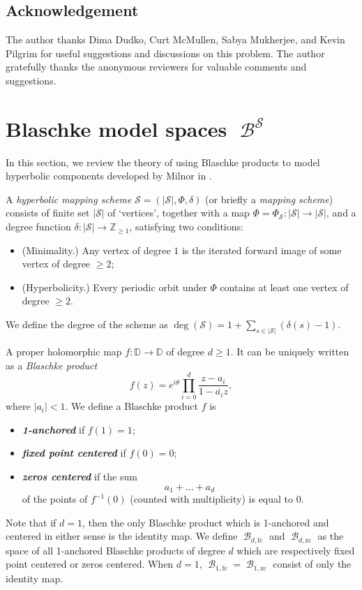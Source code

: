 \documentclass[11pt, reqno]{amsart}
\numberwithin{equation}{section}
\theoremstyle{plain}
\theoremstyle{theorem}
\theoremstyle{definition}
\newcommand{\Z}{\mathbb{Z}}
\newcommand{\D}{\mathbb{D}}
\newcommand{\fc}{\text{fc}}
\newcommand{\zc}{\text{zc}}
\DeclareMathOperator{\BP}{\mathcal{B}}
\numberwithin{figure}{section}
\begin{document}
\subsection*{Acknowledgement}
The author thanks Dima Dudko, Curt McMullen, Sabya Mukherjee, and Kevin Pilgrim for useful suggestions and discussions on this problem.
The author gratefully thanks the anonymous reviewers for valuable comments and suggestions.

\section{Blaschke model spaces $\BP^\mathcal{S}$}\label{sec:bms}
In this section, we review the theory of using Blaschke products to model hyperbolic components developed by Milnor in \cite{Milnor12}.

A {\em hyperbolic mapping scheme} $\mathcal{S} = (|\mathcal{S}|, \Phi, \delta)$ (or briefly a {\em mapping scheme}) consists of finite set $|\mathcal{S}|$ of `vertices', together with a map $\Phi = \Phi_{\mathcal{S}}: |\mathcal{S}| \longrightarrow |\mathcal{S}|$, and a degree function $\delta : |\mathcal{S}| \longrightarrow \Z_{\geq 1}$, satisfying two conditions:
\begin{itemize}
\item (Minimality.) Any vertex of degree $1$ is the iterated forward image of some vertex of degree $\geq 2$;
\item (Hyperbolicity.) Every periodic orbit under $\Phi$ contains at least one vertex of degree $\geq 2$.
\end{itemize}
We define the degree of the scheme as
$\deg(\mathcal{S}) = 1+ \sum_{s\in |\mathcal{S}|} (\delta(s)-1)$.

A proper holomorphic map $f: \D\longrightarrow \D$ of degree $d\geq 1$. 
It can be uniquely written as a {\em Blaschke product}
$$
f(z) = e^{i\theta}\prod_{i=0}^d \frac{z-a_i}{1-\overline{a_i}z},
$$
where $|a_i|<1$.
We define a Blaschke product $f$ is 
\begin{itemize}
\item {\bf \em 1-anchored} if $f(1) = 1$;
\item {\bf \em fixed point centered} if $f(0) = 0$;
\item {\bf \em zeros centered} if the sum
$$
a_1+... + a_d
$$
of the points of $f^{-1}(0)$ (counted with multiplicity) is equal to $0$.
\end{itemize}
Note that if $d=1$, then the only Blaschke product which is 1-anchored and centered in either sense is the identity map.
We define $\BP_{d, \fc}$ and $\BP_{d, \zc}$ as the space of all 1-anchored Blaschke products of degree $d$ which are respectively fixed point centered or zeros centered.
When $d=1$, $\BP_{1, \fc} = \BP_{1, \zc}$ consist of only the identity map.
\end{document}
